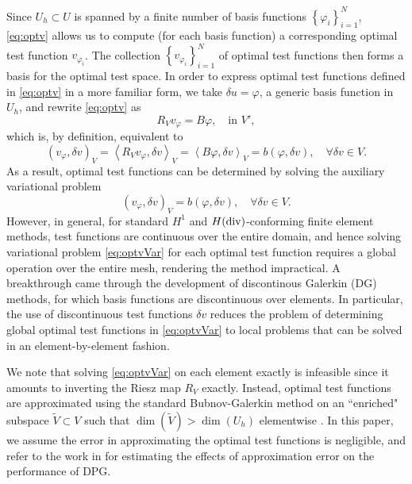 \documentclass{report}
\newcommand{\eqnlab}[1]{\label{eq:#1}}
\newcommand{\eqnref}[1]{\eqref{eq:#1}}
\newcommand{\LRp}[1]{\left( #1 \right)}
\newcommand{\LRa}[1]{\left\langle #1 \right\rangle}
\newcommand{\LRc}[1]{\left\{ #1 \right\}}
\begin{document}
Since $U_h \subset U$ is spanned by a finite number of basis functions $\LRc{\varphi_i}_{i=1}^N$, \eqnref{optv} allows us to compute (for each basis function) a corresponding optimal test function $v_{\varphi_i}$. The collection $\LRc{v_{\varphi_i}}_{i = 1}^N$ of optimal test functions then forms a basis for the optimal test space.  In order to express optimal test functions defined in \eqnref{optv} in a more familiar form, we take  $\delta u = \varphi$, a generic basis function in $U_h$, and rewrite \eqnref{optv} as
\[
R_Vv_{\varphi} = B\varphi, \quad \text{in } V',
\]
which is, by definition, equivalent to
\[
\LRp{v_\varphi,\delta v}_V = \LRa{R_Vv_\varphi,\delta v}_{V}=
\LRa{B\varphi, \delta v}_V = b\LRp{\varphi,\delta v}, \quad
\forall \delta v \in V.
\]
As a result, optimal test functions can be determined by solving the auxiliary
variational problem
\begin{equation}
\eqnlab{optvVar}
\left(v_\varphi,\delta v\right)_V = b(\varphi,\delta v), \quad \forall
\delta v \in V.
\end{equation}
However, in general, for standard $H^1$ and $H({\rm div})$-conforming finite element methods, test functions are continuous over the entire domain, and hence solving variational problem \eqnref{optvVar} for each optimal test function requires a global operation over the entire mesh, rendering the method impractical. A breakthrough came through the development of
discontinous Galerkin (DG) methods, for which basis functions are
discontinuous over elements. In particular, the use of discontinuous
test functions $\delta v$ reduces the problem of determining global 
optimal test functions
in \eqnref{optvVar} to local problems that can be solved in an
element-by-element fashion.

We note that solving \eqnref{optvVar} on each element exactly is
infeasible since it amounts to inverting the Riesz map $R_V$ exactly.
Instead, optimal test functions are approximated using the standard
Bubnov-Galerkin method on an ``enriched" subspace $\tilde{V} \subset
V$ such that $\dim(\tilde{V}) > \dim(U_h)$ elementwise \cite{DPG1, DPG2}. In this
paper, we assume the error in approximating the optimal test functions
is negligible, and refer to the work in \cite{practicalDPG} for
estimating the effects of approximation error on the performance of DPG.
\end{document}
